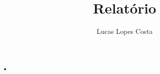 \documentclass[10pt,a4paper]{article}
\author{Lucas Lopes Costa}
\title{Relatório}
\begin{document}
•
\end{document}
